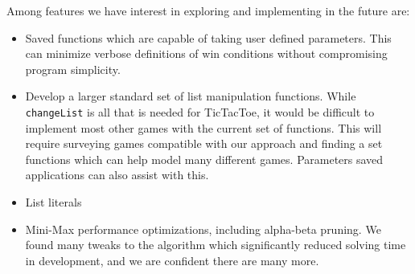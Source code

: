 \documentclass{article}
\begin{document}
Among features we have interest in exploring and implementing in the future are:
\begin{itemize}
\item Saved functions which are capable of taking user defined parameters. This can minimize verbose definitions of win conditions without compromising program simplicity.
\item Develop a larger standard set of list manipulation functions. While \verb|changeList| is all that is needed for TicTacToe, it would be difficult to implement most other games with the current set of functions. This will require surveying games compatible with our approach and finding a set functions which can help model many different games. Parameters saved applications can also assist with this.
\item List literals
\item Mini-Max performance optimizations, including alpha-beta pruning. We found many tweaks to the algorithm which  significantly reduced solving time in development, and we are confident there are many more.
\end{itemize}
\end{document}
